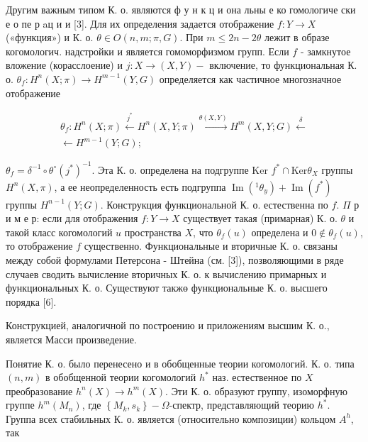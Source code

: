 \documentclass[10pt]{article}
\begin{document}
Другим важным типом К. о. являются ф у н к ц и она льны е ко гомологиче ски е о пе р aц и и [3]. Для их определения задается отображение $f: Y \rightarrow X$ («функция») и К. о. $\theta \in O(n, m ; \pi, G)$. При $m \leqslant 2 n-2 \theta$ лежит в образе когомологич. надстройки и является гомоморфизмом групп. Если $f$ - замкнутое вложение (корасслоение) и $j: X \rightarrow(X, Y)-$ включение, то функциональная К. о. $\theta_{f}: H^{n}(X ; \pi) \rightarrow H^{m-1}(Y, G)$ определяется как частичное многозначное отображение



\[

\begin{aligned}

\theta_{f}: H^{n}(X ; \pi) \stackrel{j^{*}}{\longleftarrow} H^{n}(X, Y ; \pi) \stackrel{\theta(X, Y)}{\longrightarrow} H^{m}(X, Y ; G) \stackrel{\delta}{\longleftarrow} \\

\longleftarrow H^{m-1}(Y ; G) ;

\end{aligned}

\]



$\theta_{f}=\delta^{-1} \circ \theta^{\circ}\left(j^{*}\right)^{-1}$. Эта К. о. определена на подгруппе Ker $f^{*} \cap \mathrm{Ker} \theta_{X}$ группы $H^{n}(X, \pi)$, а ее неопределенность есть подгруппа $\operatorname{Im}\left({ }^{1} \theta_{y}\right)+\operatorname{Im}\left(f^{*}\right)$ группы $H^{n-1}(Y ; G)$. Конструкция функциональной $К$. о. естественна по $f$. $\Pi$ р и м е р: если для отображения $f: Y \rightarrow X$ существует такая (примарная) К. о. $\theta$ и такой класс когомологий $u$ пространства $X$, что $\theta_{f}(u)$ определена и $0 \notin \theta_{f}(u)$, то отображение $f$ существенно. Функциональные и вторичные К. о. связаны между собой формулами Петерсона - Штейна (см. [3]), позволяющими в ряде случаев сводить вычисление вторичных К. о. к вычислению примарных и функциональных К. о. Существуют такжө функциональные К. о. высшего порядка [6].



Конструкцией, аналогичной по построению и приложениям высшим К. о., является Масси произведение.



Понятие К. о. было перенесено и в обобщенные теории когомологий. К. о. типа $(n, m)$ в обобщенной теории когомологий $h^{*}$ наз. естественное по $X$ преобразование $h^{n}(X) \rightarrow h^{m}(X)$. Эти К. о. образуют группу, изоморфную группе $h^{m}\left(M_{n}\right)$, где $\left\{M_{k}, s_{k}\right\}-\Omega$-спектр, представляющий теорию $h^{*}$. Группа всех стабильных К. о. является (относительно композиции) кольцом $A^{h}$, так
\end{document}
